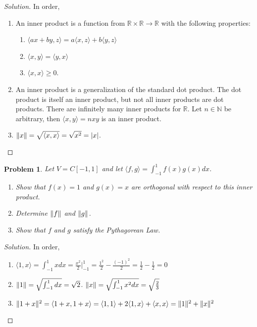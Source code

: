 \documentclass[oneside]{book}
\theoremstyle{mystyle}
\newtheorem{problem}{Problem}[section]
\DeclarePairedDelimiter\norm{\lVert}{\rVert}
\begin{document}
\begin{proof}[Solution]
In order,
\begin{enumerate}
    \item An inner product is a function from $\mathbb{R}\times \mathbb{R}\rightarrow \mathbb{R}$ with the following properties:
    \begin{enumerate}
        \item $\langle ax+by,z\rangle = a\langle x,z\rangle+b\langle y,z\rangle$
        \item $\langle x,y\rangle = \langle y,x \rangle$
        \item $\langle x,x\rangle \geq 0$.
    \end{enumerate}
    \item An inner product is a generalization of the standard dot product. The dot product is itself an inner product, but not all inner products are dot products. There are infinitely many inner products for $\mathbb{R}$. Let $n\in \mathbb{N}$ be arbitrary, then $\langle x,y \rangle = nxy$ is an inner product.
    \item $\norm{x} = \sqrt{\langle x,x \rangle } = \sqrt{x^2}= |x|$.
\end{enumerate}
\end{proof}
\begin{problem}
Let $V = C[-1,1]$ and let $\langle f,g\rangle = \int_{-1}^{1} f(x)g(x)dx$.
\begin{enumerate}
    \item Show that $f(x)=1$ and $g(x) = x$ are orthogonal with respect to this inner product.
    \item Determine $\norm{f}$ and $\norm{g}$.
    \item Show that $f$ and $g$ satisfy the Pythagorean Law.
\end{enumerate}
\end{problem}
\begin{proof}[Solution]
In order,
\begin{enumerate}
    \item $\langle 1,x\rangle = \int_{-1}^{1} xdx = \frac{x^2}{2}\big|_{-1}^{1} = \frac{1^2}{2}-\frac{(-1)^2}{2} = \frac{1}{2}-\frac{1}{2} = 0$
    \item $\norm{1} = \sqrt{ \int_{-1}^{1} dx} = \sqrt{2}$. $\norm{x} = \sqrt{\int_{-1}^{1}x^2dx} = \sqrt{\frac{2}{3}}$
    \item $\norm{1+x}^2 = \langle 1+x,1+x\rangle = \langle 1,1\rangle + 2\langle 1,x \rangle + \langle x,x\rangle = \norm{1}^2 + \norm{x}^2$
\end{enumerate}
\end{proof}
\end{document}
